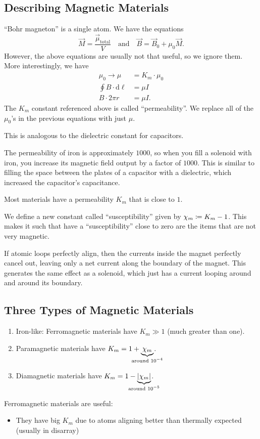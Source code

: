 \documentclass[class=article, crop=false]{standalone}
\begin{document}
  \subsection{Describing Magnetic Materials}
  ``Bohr magneton'' is a single atom. We have the equations 
  \[
    \vec{M} = \frac{\vec{\mu}_\text{total}}{V}\quad \text{and} \quad \vec{B} = \vec{B}_0 + \mu_0\vec{M}.
  \]
  However, the above equations are usually not that useful, so we ignore them. More interestingly, we have
  \begin{align*}
    \mu_0\to \mu &= K_m\cdot \mu_0 \\
    \oint B\cdot \mathrm{d}\ell &= \mu I \\
    B\cdot 2\pi r &= \mu I.
  \end{align*}
  The $K_m$ constant referenced above is called ``permeability''. We replace all of the $\mu_0$'s in the previous equations with just $\mu$.
  \begin{note}{}
    This is analogous to the dielectric constant for capacitors.
  \end{note}
  \begin{example}{}
    The permeability of iron is approximately $1000$, so when you fill a solenoid with iron, you increase its magnetic field output by a factor of $1000$. This is similar to filling the space between the plates of a capacitor with a dielectric, which increased the capacitor's capacitance.
  \end{example}
  \begin{note}{}
    Most materials have a permeability $K_m$ that is close to $1$.
  \end{note}
  We define a new constant called ``susceptibility'' given by $\chi_m \coloneqq K_m - 1$. This makes it such that have a ``susceptibility'' close to zero are the items that are not very magnetic. \par
  If atomic loops perfectly align, then the currents inside the magnet perfectly cancel out, leaving only a net current along the boundary of the magnet. This generates the same effect as a solenoid, which just has a current looping around and around its boundary. 
  \subsection{Three Types of Magnetic Materials}
  \begin{enumerate}
    \item Iron-like: Ferromagnetic materials have $K_m \gg 1$ (much greater than one).
    \item Paramagnetic materials have $K_m = 1 + \underbrace{\chi_m}_{\mathclap{\text{around }10^{-4}}}$.
    \item Diamagnetic materials have $K_m = 1 - \underbrace{\abs{\chi_m}}_{\mathclap{\text{around }10^{-5}}}$.
  \end{enumerate}
  Ferromagnetic materials are useful:
  \begin{itemize}
    \item They have big $K_m$ due to atoms aligning better than thermally expected (usually in disarray)
  \end{itemize}
\end{document}
